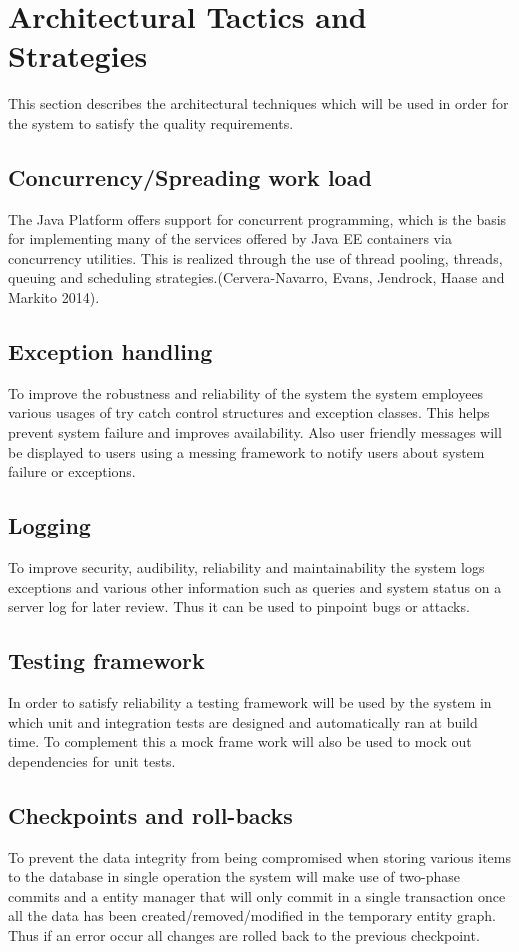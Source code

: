 \documentclass[12pt]{article}
\begin{document}
\section{Architectural Tactics and Strategies} %
This section describes the architectural techniques which will be used in order for the system to satisfy the quality requirements. 

\subsection{Concurrency/Spreading work load}
The Java Platform offers support for concurrent programming, which is the basis for implementing many of the services offered by Java EE containers via concurrency utilities. This is realized through the use of thread pooling, threads, queuing and scheduling strategies.(Cervera-Navarro, Evans, Jendrock, Haase and Markito 2014).\\

\subsection{Exception handling}
To improve the robustness and reliability of the system the system employees various usages of try catch control structures and exception classes. This helps prevent system failure and improves availability. Also user friendly messages will be displayed to users using a messing framework to notify users about system failure or exceptions.

\subsection{Logging}
To improve security, audibility, reliability and maintainability the system logs exceptions and various other information such as queries and system status on a server log for later review. Thus it can be used to pinpoint bugs or attacks.

\subsection{Testing framework}
In order to satisfy reliability a testing framework will be used by the system in which unit and integration tests are designed and automatically ran at build time. To complement this a mock frame work will also be used to mock out dependencies for unit tests.

\subsection{Checkpoints and roll-backs}
To prevent the data integrity from being compromised when storing various items to the database in single operation the system will make use of two-phase commits and a entity manager that will only commit in a single transaction once all the data has been created/removed/modified in the temporary entity graph. Thus if an error occur all changes are rolled back to the previous checkpoint.
\end{document}
